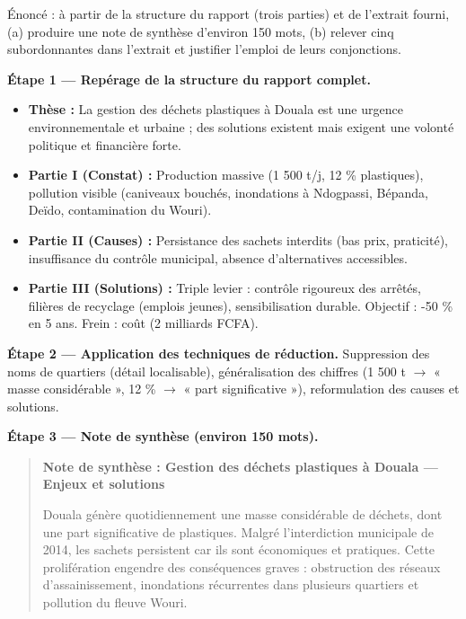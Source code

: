 \documentclass[11pt]{article}
\begin{document}
\begin{exoresolu}
Énoncé : à partir de la structure du rapport (trois parties) et de l'extrait fourni, (a) produire une note de synthèse d'environ 150 mots, (b) relever cinq subordonnantes dans l'extrait et justifier l'emploi de leurs conjonctions.

\tcblower

\textbf{Étape 1 — Repérage de la structure du rapport complet.}
\begin{itemize}
\item \textbf{Thèse :} La gestion des déchets plastiques à Douala est une urgence environnementale et urbaine ; des solutions existent mais exigent une volonté politique et financière forte.
\item \textbf{Partie I (Constat) :} Production massive (1 500 t/j, 12 \% plastiques), pollution visible (caniveaux bouchés, inondations à Ndogpassi, Bépanda, Deïdo, contamination du Wouri).
\item \textbf{Partie II (Causes) :} Persistance des sachets interdits (bas prix, praticité), insuffisance du contrôle municipal, absence d'alternatives accessibles.
\item \textbf{Partie III (Solutions) :} Triple levier : contrôle rigoureux des arrêtés, filières de recyclage (emplois jeunes), sensibilisation durable. Objectif : -50 \% en 5 ans. Frein : coût (2 milliards FCFA).
\end{itemize}

\textbf{Étape 2 — Application des techniques de réduction.}
Suppression des noms de quartiers (détail localisable), généralisation des chiffres (1 500 t $\rightarrow$ « masse considérable », 12 \% $\rightarrow$ « part significative »), reformulation des causes et solutions.

\textbf{Étape 3 — Note de synthèse (environ 150 mots).}

\begin{quote}
\textbf{Note de synthèse : Gestion des déchets plastiques à Douala — Enjeux et solutions}

Douala génère quotidiennement une masse considérable de déchets, dont une part significative de plastiques. Malgré l'interdiction municipale de 2014, les sachets persistent car ils sont économiques et pratiques. Cette prolifération engendre des conséquences graves : obstruction des réseaux d'assainissement, inondations récurrentes dans plusieurs quartiers et pollution du fleuve Wouri.


\end{quote}
\end{exoresolu}
\end{document}
